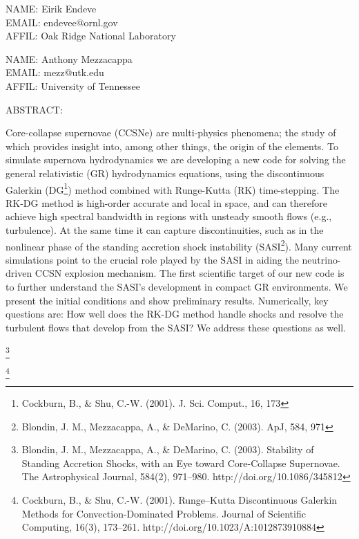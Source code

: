 \documentclass[11pt]{article}
\begin{document}

NAME: Eirik Endeve \\
EMAIL: endevee@ornl.gov \\
AFFIL: Oak Ridge National Laboratory

NAME: Anthony Mezzacappa \\
EMAIL: mezz@utk.edu \\
AFFIL: University of Tennessee

ABSTRACT:

Core-collapse supernovae (CCSNe) are multi-physics phenomena; the study of which provides insight into, among other things, the origin of the elements. To simulate supernova hydrodynamics we are developing a new code for solving the general relativistic (GR) hydrodynamics equations, using the discontinuous Galerkin (DG\footnote{Cockburn, B., \& Shu, C.-W. (2001). J. Sci. Comput., 16, 173}) method combined with Runge-Kutta (RK) time-stepping. The RK-DG method is high-order accurate and local in space, and can therefore achieve high spectral bandwidth in regions with unsteady smooth flows (e.g., turbulence). At the same time it can capture discontinuities, such as in the nonlinear phase of the standing accretion shock instability (SASI\footnote{Blondin, J. M., Mezzacappa, A., \& DeMarino, C. (2003). ApJ, 584, 971}). Many current simulations point to the crucial role played by the SASI in aiding the neutrino-driven CCSN explosion mechanism. The first scientific target of our new code is to further understand the SASI's development in compact GR environments. We present the initial conditions and show preliminary results. Numerically, key questions are: How well does the RK-DG method handle shocks and resolve the turbulent flows that develop from the SASI? We address these questions as well.


\footnote{Blondin, J. M., Mezzacappa, A., \& DeMarino, C. (2003). Stability of Standing Accretion Shocks, with an Eye toward Core-Collapse Supernovae. The Astrophysical Journal, 584(2), 971--980. http://doi.org/10.1086/345812}

\footnote{Cockburn, B., \& Shu, C.-W. (2001). Runge--Kutta Discontinuous Galerkin Methods for Convection-Dominated Problems. Journal of Scientific Computing, 16(3), 173--261. http://doi.org/10.1023/A:1012873910884}
\end{document}
